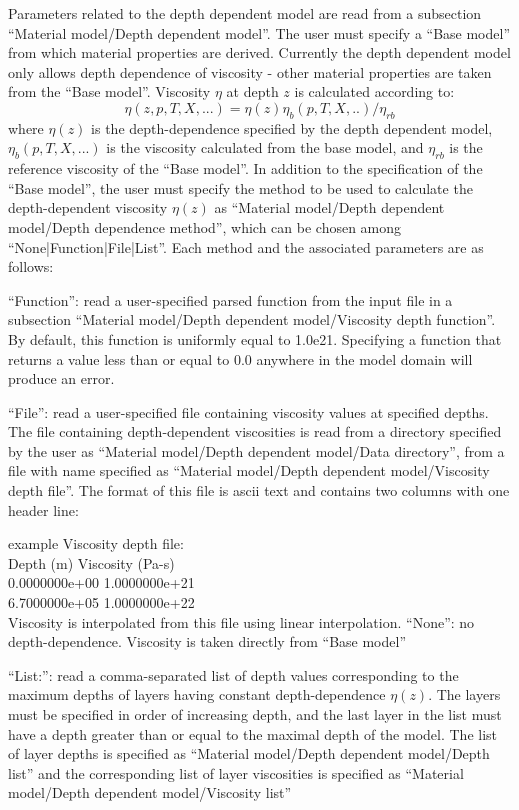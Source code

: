 \begin{itemize}
Parameters related to the depth dependent model are read from a subsection ``Material model/Depth dependent model''. The user must specify a ``Base model'' from which material properties are derived. Currently the depth dependent model only allows depth dependence of viscosity - other material properties are taken from the ``Base model''. Viscosity $\eta$ at depth $z$ is calculated according to:\begin{equation}\eta(z,p,T,X,...) = \eta(z) \eta_b(p,T,X,..)/\eta_{rb}\end{equation}where $\eta(z)$ is the depth-dependence specified by the depth dependent model, $\eta_b(p,T,X,...)$ is the viscosity calculated from the base model, and $\eta_{rb}$ is the reference viscosity of the ``Base model''. In addition to the specification of the ``Base model'', the user must specify the method to be used to calculate the depth-dependent viscosity $\eta(z)$ as ``Material model/Depth dependent model/Depth dependence method'', which can be chosen among ``None|Function|File|List''. Each method and the associated parameters are as follows:

``Function'': read a user-specified parsed function from the input file in a subsection ``Material model/Depth dependent model/Viscosity depth function''. By default, this function is uniformly equal to 1.0e21. Specifying a function that returns a value less than or equal to 0.0 anywhere in the model domain will produce an error. 

``File'': read a user-specified file containing viscosity values at specified depths. The file containing depth-dependent viscosities is read from a directory specified by the user as ``Material model/Depth dependent model/Data directory'', from a file with name specified as ``Material model/Depth dependent model/Viscosity depth file''. The format of this file is ascii text and contains two columns with one header line:

example Viscosity depth file:\\Depth (m)    Viscosity (Pa-s)\\0.0000000e+00     1.0000000e+21\\6.7000000e+05     1.0000000e+22\\

Viscosity is interpolated from this file using linear interpolation. ``None'': no depth-dependence. Viscosity is taken directly from ``Base model''

``List:'': read a comma-separated list of depth values corresponding to the maximum depths of layers having constant depth-dependence $\eta(z)$. The layers must be specified in order of increasing depth, and the last layer in the list must have a depth greater than or equal to the maximal depth of the model. The list of layer depths is specified as ``Material model/Depth dependent model/Depth list'' and the corresponding list of layer viscosities is specified as ``Material model/Depth dependent model/Viscosity list''


\end{itemize}
